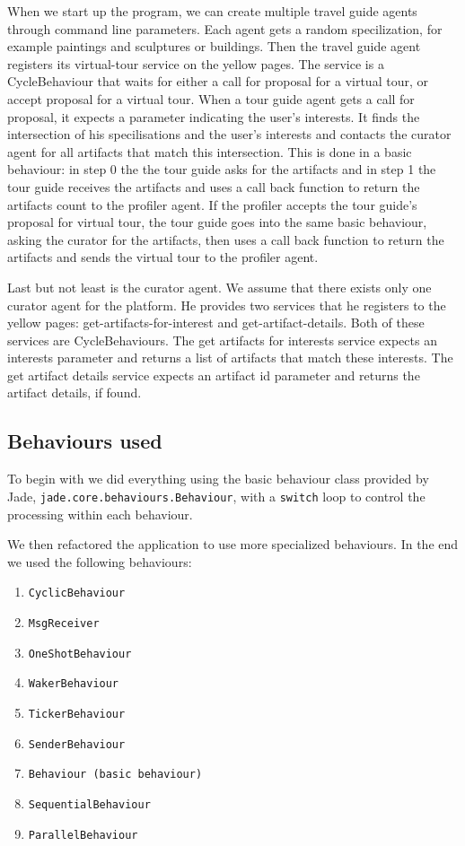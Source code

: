 \documentclass[a4paper, 11pt]{article}
\begin{document}
When we start up the program, we can create multiple travel guide agents through command line parameters. Each agent gets a random specilization, for example paintings and sculptures or buildings. Then the travel guide agent registers its virtual-tour service on the yellow pages. The service is a CycleBehaviour that waits for either a call for proposal for a virtual tour, or accept proposal for a virtual tour. When a tour guide agent gets a call for proposal, it expects a parameter indicating the user's interests. It finds the intersection of his specilisations and the user's interests and contacts the curator agent for all artifacts that match this intersection. This is done in a basic behaviour: in step 0 the the tour guide asks for the artifacts and in step 1 the tour guide receives the artifacts and uses a call back function to return the artifacts count to the profiler agent.
If the profiler accepts the tour guide's proposal for virtual tour, the tour guide goes into the same basic behaviour, asking the curator for the artifacts, then uses a call back function to return the artifacts and sends the virtual tour to the profiler agent.

Last but not least is the curator agent. We assume that there exists only one curator agent for the platform. He provides two services that he registers to the yellow pages: get-artifacts-for-interest and get-artifact-details.
Both of these services are CycleBehaviours. The get artifacts for interests service expects an interests parameter and returns a list of artifacts that match these interests. The get artifact details service expects an artifact id parameter and returns the artifact details, if found.

\subsection{Behaviours used}

To begin with we did everything using the basic behaviour class provided by Jade, \texttt{jade.core.behaviours.Behaviour}, with a \texttt{switch} loop to control the processing within each behaviour.

We then refactored the application to use more specialized behaviours. In the end we used the following behaviours:

\begin{enumerate}
    \item \texttt{CyclicBehaviour}
    \item \texttt{MsgReceiver}
    \item \texttt{OneShotBehaviour}
    \item \texttt{WakerBehaviour}
    \item \texttt{TickerBehaviour}
    \item \texttt{SenderBehaviour}
    \item \texttt{Behaviour (basic behaviour)}
    \item \texttt{SequentialBehaviour}
    \item \texttt{ParallelBehaviour}
\end{enumerate}
\end{document}
